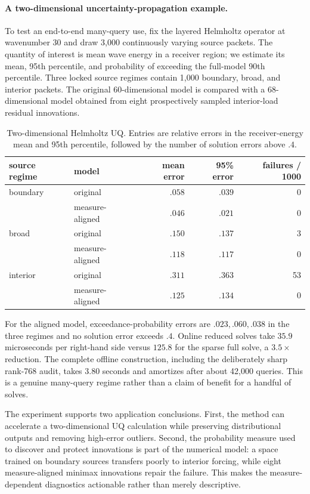 \documentclass[11pt]{article}
\numberwithin{algorithm}{section}
\theoremstyle{definition}\newtheorem{definition}[theorem]{Definition}
\theoremstyle{remark}\newtheorem{remark}[theorem]{Remark}
\begin{document}
\paragraph{A two-dimensional uncertainty-propagation example.}
To test an end-to-end many-query use, fix the layered Helmholtz operator at
wavenumber 30 and draw 3,000 continuously varying source packets. The quantity
of interest is mean wave energy in a receiver region; we estimate its mean,
95th percentile, and probability of exceeding the full-model 90th percentile.
Three locked source regimes contain 1,000 boundary, broad, and interior packets.
The original 60-dimensional model is compared with a 68-dimensional model
obtained from eight prospectively sampled interior-load residual innovations.
\begin{table}[H]
\centering
\caption{Two-dimensional Helmholtz UQ. Entries are relative errors in the
receiver-energy mean and 95th percentile, followed by the number of solution
errors above $.4$.}
\label{tab:helmholtz-uq}
\begin{tabular}{llrrr}
\toprule
source regime & model & mean error & 95\% error & failures / 1000\\
\midrule
boundary & original & $.058$ & $.039$ & 0\\
         & measure-aligned & $.046$ & $.021$ & 0\\
broad    & original & $.150$ & $.137$ & 3\\
         & measure-aligned & $.118$ & $.117$ & 0\\
interior & original & $.311$ & $.363$ & 53\\
         & measure-aligned & $.125$ & $.134$ & 0\\
\bottomrule
\end{tabular}
\end{table}
For the aligned model, exceedance-probability errors are $.023,.060,.038$ in
the three regimes and no solution error exceeds $.4$. Online reduced solves
take $35.9$ microseconds per right-hand side versus $125.8$ for the sparse full
solve, a $3.5\times$ reduction. The complete offline construction, including
the deliberately sharp rank-768 audit, takes 3.80 seconds and amortizes after
about 42,000 queries. This is a genuine many-query regime rather than a claim
of benefit for a handful of solves.

The experiment supports two application conclusions. First, the method can
accelerate a two-dimensional UQ calculation while preserving distributional
outputs and removing high-error outliers. Second, the probability measure used
to discover and protect innovations is part of the numerical model: a space
trained on boundary sources transfers poorly to interior forcing, while eight
measure-aligned minimax innovations repair the failure. This makes the
measure-dependent diagnostics actionable rather than merely descriptive.
\end{document}
